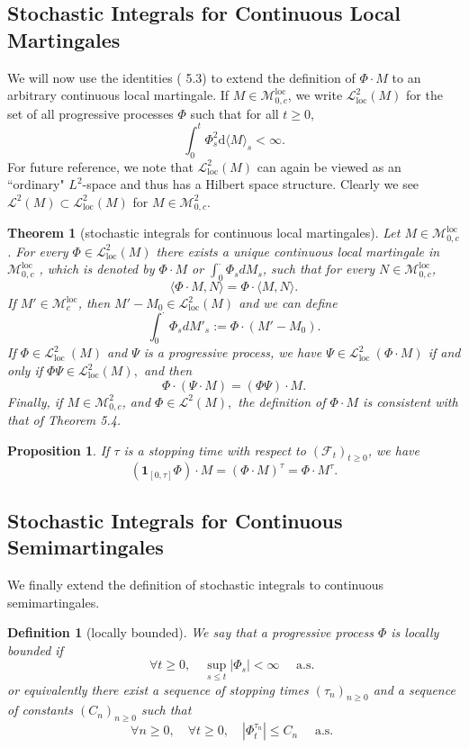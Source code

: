 \documentclass{article}
\newtheorem{definition}{Definition}[section]
\newtheorem{proposition}{Proposition}[section]
\newtheorem{theorem}{Theorem}[section]
\theoremstyle{nonumberplain}
\begin{document}
\subsection{Stochastic Integrals for Continuous Local Martingales}

We will now use the identities ( 5.3) to extend the definition of $\Phi \cdot M$ to an arbitrary continuous local martingale. If $M\in\mathscr{M}^{\mathrm{loc}}_{0,c}$, we write $\mathscr{L}_{\mathrm{loc}}^{2}(M)$ for the set of all progressive processes $\Phi$ such that for all $t\ge0$,
\[
\int_{0}^{t} \Phi_{s}^{2} \mathrm{d}\langle M\rangle_{s}<\infty.
\]
For future reference, we note that $\mathscr{L}_{\mathrm{loc}}^{2}(M)$ can again be viewed as an ``ordinary" $L^{2}$-space and thus has a Hilbert space structure. Clearly we see $\mathscr{L}^{2}(M)\subset\mathscr{L}_{\mathrm{loc}}^{2}(M)$ for $M\in\mathscr{M}^{2}_{0,c}$.


\begin{theorem}[stochastic integrals for continuous local martingales]
	Let $M\in\mathscr{M}^{\mathrm{loc}}_{0,c}$. For every $\Phi \in \mathscr{L}_{\mathrm{loc}}^{2}(M)$ there exists a unique continuous local martingale in $\mathscr{M}^{\mathrm{loc}}_{0,c}$ , which is denoted by $\Phi \cdot M$ or $\int_{0}^{\cdot}\Phi_sdM_s$, such that for every $N\in\mathscr{M}^{\mathrm{loc}}_{0,c}$,
	\[
	\langle \Phi \cdot M, N\rangle= \Phi \cdot\langle M, N\rangle.
	\]
	If $M'\in\mathscr{M}^{\mathrm{loc}}_{c}$, then $M'-M_0\in \mathscr{L}_{\mathrm{loc}}^{2}(M)$ and we can define
	\[
	\int_{0}^{\cdot}\Phi_sdM'_s:=\Phi\cdot(M'-M_0).
	\]
	If $\Phi \in \mathscr{L}_{\text {loc }}^{2}(M)$ and $\Psi$ is a progressive process, we have $\Psi \in \mathscr{L}_{\text {loc }}^{2}(\Phi \cdot M)$ if and only if $\Phi \Psi \in \mathscr{L}_{\mathrm{loc}}^{2}(M),$ and then
	\[
	\Phi \cdot(\Psi \cdot M)=(\Phi \Psi) \cdot M.
	\]
	Finally, if $M\in\mathscr{M}^{2}_{0,c}$, and $\Phi \in\mathscr{L}^{2}(M),$ the definition of $\Phi \cdot M$ is consistent with that of Theorem 5.4.
\end{theorem}

\begin{proposition}
	If $\tau$ is a stopping time with respect to $(\mathcal{F}_t)_{t\ge0}$, we have
	\[
	\left(\mathbf{1}_{[0, \tau]} \Phi\right) \cdot M=(\Phi \cdot M)^{\tau}=\Phi \cdot M^{\tau}.
	\]
\end{proposition}

\subsection{Stochastic Integrals for Continuous Semimartingales}
We finally extend the definition of stochastic integrals to continuous semimartingales. 
\begin{definition}[locally bounded]
We say that a progressive process $\Phi$ is locally bounded if
\[
\forall t \geq 0, \quad \sup _{s \leq t}\left|\Phi_{s}\right|<\infty \quad \text { a.s. }
\]
or equivalently there exist a sequence of stopping times $(\tau_{n})_{n \geq 0}$ and a sequence of constants $(C_n)_{n \geq 0}$ such that
\[
\forall n \geq 0, \quad \forall t \geq 0, \quad \left|\Phi_{t}^{\tau_{n}}\right| \leq C_{n}\quad \text { a.s. }
\]
\end{definition}
\end{document}
